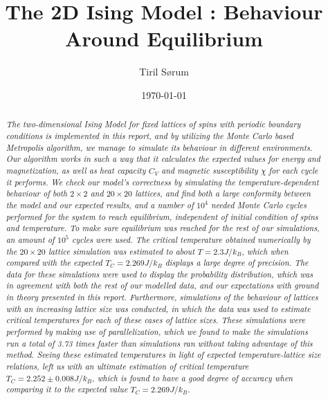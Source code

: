 \documentclass[10pt, nofootinbib, twocolumn]{revtex4-1}
\begin{document}
\vspace*{2\baselineskip}
\title{The 2D Ising Model : Behaviour Around Equilibrium} 
\author{Tiril Sørum}
\date{\today}        
\begin{abstract}
\vspace*{1\baselineskip}
    \textit{The two-dimensional Ising Model for fixed lattices of spins with periodic boundary conditions is implemented in this report, and by utilizing the Monte Carlo based Metropolis algorithm, we manage to simulate its behaviour in different environments. Our algorithm works in such a way that it calculates the expected values for energy and magnetization, as well as heat capacity $C_V$ and magnetic susceptibility $\chi$ for each cycle it performs. We check our model's correctness by simulating the temperature-dependent behaviour of both $2\times 2$ and $20\times 20$ lattices, and find both a large conformity between the  model and our expected results, and a number of $10^4$ needed Monte Carlo cycles performed for the system to reach equilibrium, independent of initial condition of spins and temperature. To make sure equilibrium was reached for the rest of our simulations, an amount of  $10^5$ cycles were used. The critical temperature obtained numerically by the $20\times 20$ lattice simulation was estimated to about $T=2.3J/k_B$, which when compared with the expected $T_C=2.269J/k_B$ displays a large degree of precision. The data for these simulations were used to display the probability distribution, which was in agreement with both the rest of our modelled data, and our expectations with ground in theory presented in this report. Furthermore, simulations of the behaviour of lattices with an increasing lattice size was conducted, in which the data was used to estimate critical temperatures for each of these cases of lattice sizes. These simulations were performed by making use of parallelization, which we found to make the simulations run a total of 3.73 times faster than simulations ran without taking advantage of this method. Seeing these estimated temperatures in light of expected temperature-lattice size relations, left us with an ultimate estimation of critical temperature $T_C = 2.252\pm 0.008J/k_B$, which is found to have a good degree of accuracy when comparing it to the expected value $T_C=2.269J/k_B$.}
\end{abstract}
\maketitle       
\end{document}
